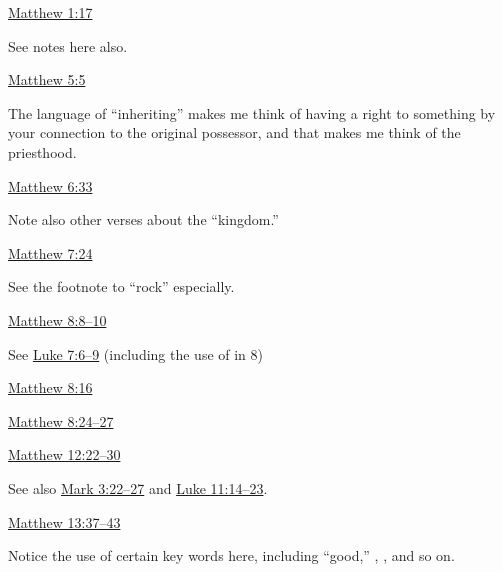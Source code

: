 			\begin{compactdesc}
				\item[{\hyperref[MATTHEW-1-17]{Matthew 1:17}}] \phantom{.}
					\begin{compactitem}
						\item See notes here also.
					\end{compactitem}
				\item[{\hyperref[MATTHEW-5-5]{Matthew 5:5}}] \phantom{.}
					\begin{compactitem}
						\item The language of ``inheriting'' makes me think of having a right to something by your connection to the original possessor, and that makes me think of the priesthood.
					\end{compactitem}
				\item[{\hyperref[MATTHEW-6-33]{Matthew 6:33}}] \phantom{.}
					\begin{compactitem}
						\item Note also other verses about the ``kingdom.''
					\end{compactitem}
				\item[{\hyperref[MATTHEW-7-24]{Matthew 7:24}}] \phantom{.}
					\begin{compactitem}
						\item See the footnote to ``rock'' especially.
					\end{compactitem}
				\item[{\hyperref[MATTHEW-8-8]{Matthew 8:8--10}}] \phantom{.}
					\begin{compactitem}
						\item See \hyperref[LUKE-7-6]{Luke 7:6--9} (including the use of  in 8)
					\end{compactitem}
				\item[{\hyperref[MATTHEW-8-16]{Matthew 8:16}}]
				\item[{\hyperref[MATTHEW-8-24]{Matthew 8:24--27}}]
				\item[{\hyperref[MATTHEW-12-22]{Matthew 12:22--30}}] \phantom{.}
					\begin{compactitem}
						\item See also \hyperref[MARK-3-22]{Mark 3:22--27} and \hyperref[LUKE-11-14]{Luke 11:14--23}.
					\end{compactitem}
				\item[{\hyperref[MATTHEW-13-43]{Matthew 13:37--43}}] \phantom{.}
					\begin{compactitem}
						\item Notice the use of certain key words here, including ``good,'' , \gr{ἀνομία}, and so on.

\end{compactitem}
\end{compactdesc}
